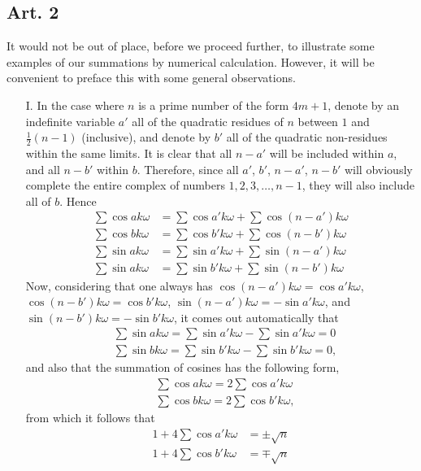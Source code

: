 \documentclass{book}
\theoremstyle{plain}
\theoremstyle{remark}
\begin{document}
\subsection*{Art. 2} 

It would not be out of place, before we proceed further, to illustrate some examples of our summations by numerical calculation.  However, it will be convenient to preface this with some general observations.

\begin{enumerate}
\item[I.] In the case where $n$ is a prime number of the form $4m+1$, denote by an indefinite variable $a'$ all of the quadratic residues of $n$ between $1$ and $\tfrac{1}{2}(n-1)$ (inclusive), and denote by $b'$ all of the quadratic non-residues within the same limits.  It is clear that all $n-a'$ will be included within $a$, and all $n-b'$ within $b$.   Therefore, since all $a'$, $b'$, $n-a'$, $n-b'$ will obviously complete the entire complex of numbers $1,2,3,\dots,n-1$, they will also include all of $b$.  Hence 
\begin{align*} \sum \cos ak\omega &= \sum \cos a'k\omega + \sum \cos(n-a')k\omega \\ 
\sum \cos bk\omega &= \sum \cos b'k\omega + \sum \cos(n-b')k\omega \\
\sum \sin ak\omega &= \sum \sin a'k\omega + \sum \sin(n-a')k\omega \\
\sum \sin ak\omega &= \sum \sin b'k\omega + \sum \sin(n-b')k\omega \end{align*}
Now, considering that one always has $\cos(n-a')k\omega = \cos a'k\omega$, $\cos(n-b')k\omega = \cos b'k\omega$, $\sin(n-a')k\omega = - \sin a' k\omega$, and $\sin(n-b')k\omega = -\sin b'k\omega$, it comes out automatically that
\begin{align*} & \sum \sin ak\omega = \sum \sin a'k\omega - \sum \sin a'k\omega = 0 \\
& \sum \sin b k \omega = \sum \sin b'k\omega - \sum \sin b'k\omega = 0,
\end{align*}
and also that the summation of cosines has the following form,
\begin{align*} &\sum \cos ak\omega = 2 \sum \cos a'k\omega \\
&\sum \cos bk\omega = 2 \sum \cos b'k\omega, \end{align*}
from which it follows that 
\begin{align*} 1 + 4 \sum \cos a'k\omega &= \pm \sqrt{n} \\
1 + 4 \sum \cos b'k\omega &= \mp \sqrt{n} \\

\end{align*}
\end{enumerate}
\end{document}
